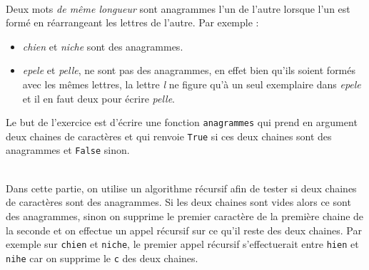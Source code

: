 \documentclass[11pt,a4paper]{article}
\begin{document}
\begin{Exercise}[title = {anagrammes}] \\
	Deux mots \textit{de même longueur} sont anagrammes l'un de l'autre lorsque l'un est formé en réarrangeant les lettres de l'autre. Par exemple :
	\begin{itemize}
		\item \textit{chien} et \textit{niche} sont des anagrammes.
		\item \textit{epele} et \textit{pelle}, ne sont pas des anagrammes, en effet bien qu'ils soient formés avec les mêmes lettres, la lettre \textit{l} ne figure qu'à un seul exemplaire dans \textit{epele} et il en faut deux pour écrire \textit{pelle}.
	\end{itemize}
	Le but de l'exercice est d'écrire une fonction {\tt anagrammes} qui prend en argument deux chaines de caractères et qui renvoie {\tt True} si ces deux chaines sont des anagrammes et {\tt False} sinon.

	\ExePart[name = Une approche récursive]\\
Dans cette partie, on utilise un algorithme récursif afin de tester si deux chaines de caractères sont des anagrammes. Si les deux chaines sont vides alors ce sont des anagrammes, sinon on supprime le premier caractère de la première chaine de la seconde et on effectue un appel récursif sur ce qu'il reste des deux chaines. Par exemple sur {\tt chien} et {\tt niche}, le premier appel récursif s'effectuerait entre {\tt hien} et {\tt nihe} car on supprime le {\tt c} des deux chaines. 
	


\end{Exercise}
\end{document}
